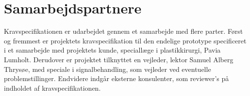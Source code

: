 	\section{Samarbejdspartnere}	 
	Kravspecifikationen er udarbejdet gennem et samarbejde med flere parter. 
	Først og fremmest er projektets kravspecifikation til den endelige prototype specificeret i et samarbejde med projektets kunde, speciallæge i plastikkirurgi, Pavia Lumholt.  
	Derudover er projektet tilknyttet en vejleder, lektor Samuel Alberg Thrysøe, med speciale i signalbehandling, som vejleder ved eventuelle problemstillinger.  
	Endvidere indgår eksterne konsulenter, som reviewer's på indholdet af kravspecifikationen.   
 	
  
 